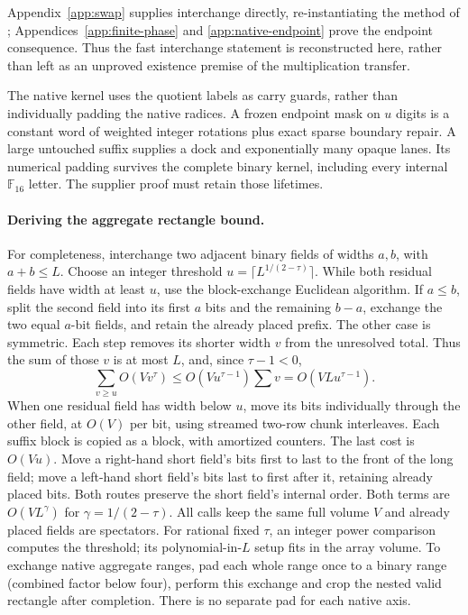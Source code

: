 \documentclass[11pt]{article}
\newcommand{\F}{\mathbb F}
\begin{document}
Appendix~\ref{app:swap} supplies interchange directly, re-instantiating
the method of \cite{swap}; Appendices~\ref{app:finite-phase} and
\ref{app:native-endpoint} prove the endpoint consequence. Thus the fast
interchange statement is reconstructed here, rather than left as an
unproved existence premise of the multiplication transfer.

The native kernel uses the quotient labels as carry guards, rather
than individually padding the native radices. A frozen endpoint mask
on $u$ digits is a constant word of weighted integer rotations plus
exact sparse boundary repair. A large untouched suffix supplies a dock
and exponentially many opaque lanes. Its numerical padding survives
the complete binary kernel, including every internal $\F_{16}$ letter.
The supplier proof must retain those lifetimes.

\paragraph{Deriving the aggregate rectangle bound.}
For completeness, interchange two adjacent binary fields of widths
$a,b$, with $a+b\le L$. Choose an integer threshold
$u=\lceil L^{1/(2-\tau)}\rceil$. While both residual fields have
width at least $u$, use the block-exchange Euclidean algorithm.
If $a\le b$, split the second field into its first $a$ bits and the
remaining $b-a$, exchange the two equal $a$-bit fields, and retain
the already placed prefix. The other case is symmetric. Each step
removes its shorter width $v$ from the unresolved total. Thus the
sum of those $v$ is at most $L$, and, since $\tau-1<0$,
\[
 \sum_{v\ge u}O(Vv^\tau)
   \le O(Vu^{\tau-1})\sum v
   =O(VLu^{\tau-1}).
\]
When one residual field has width below $u$, move its bits individually
through the other field, at $O(V)$ per bit, using streamed two-row
chunk interleaves. Each suffix block is copied as a block, with
amortized counters. The last cost is $O(Vu)$.
Move a right-hand short field's bits first to last to the front of
the long field; move a left-hand short field's bits last to first
after it, retaining already placed bits. Both routes preserve the
short field's internal order.
Both terms are $O(VL^\gamma)$ for $\gamma=1/(2-\tau)$.
All calls keep the same full volume $V$ and already placed fields are
spectators. For rational fixed $\tau$, an integer power comparison
computes the threshold; its polynomial-in-$L$ setup fits in the
array volume. To exchange native aggregate ranges, pad each whole
range once to a binary range (combined factor below four), perform
this exchange and crop the nested valid rectangle after completion.
There is no separate pad for each native axis.
\end{document}
